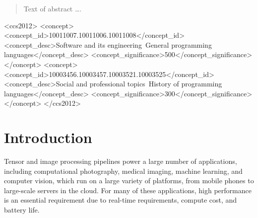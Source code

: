 \documentclass[sigplan,review,anonymous]{acmart}\settopmatter{printfolios=true,printccs=false,printacmref=false}
\begin{document}
\begin{abstract}
Text of abstract \ldots.
\end{abstract}


\begin{CCSXML}
<ccs2012>
<concept>
<concept_id>10011007.10011006.10011008</concept_id>
<concept_desc>Software and its engineering~General programming languages</concept_desc>
<concept_significance>500</concept_significance>
</concept>
<concept>
<concept_id>10003456.10003457.10003521.10003525</concept_id>
<concept_desc>Social and professional topics~History of programming languages</concept_desc>
<concept_significance>300</concept_significance>
</concept>
</ccs2012>
\end{CCSXML}





\maketitle


\section{Introduction}
Tensor and image processing pipelines power a large number of applications,
including computational photography, medical imaging, machine learning,
and computer vision, which run on a large variety of platforms, from
mobile phones to large-scale servers in the cloud.  For many of these
applications, high performance is an essential requirement due to real-time
requirements, compute cost, and battery life.
\end{document}
